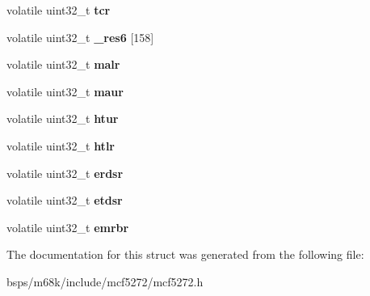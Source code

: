 \begin{DoxyCompactItemize}
\mbox{\label{structenet__regs__t_ad500d2fb5cc2c951c987d8d2b84334c3}} 
volatile uint32\+\_\+t {\bfseries tcr}
\item 
\mbox{\label{structenet__regs__t_a6ca7952eb64146f7015ad9e3bef0a038}} 
volatile uint32\+\_\+t {\bfseries \+\_\+res6} \mbox{[}158\mbox{]}
\item 
\mbox{\label{structenet__regs__t_aa9d3849bd62e420956f5fb5ec650e377}} 
volatile uint32\+\_\+t {\bfseries malr}
\item 
\mbox{\label{structenet__regs__t_a289d43007238bbc47a5179d5b0d11570}} 
volatile uint32\+\_\+t {\bfseries maur}
\item 
\mbox{\label{structenet__regs__t_afa4af73d0d5f907da00906e9e0e3ebcf}} 
volatile uint32\+\_\+t {\bfseries htur}
\item 
\mbox{\label{structenet__regs__t_a25bf1aad6c37badac739b68b90688288}} 
volatile uint32\+\_\+t {\bfseries htlr}
\item 
\mbox{\label{structenet__regs__t_a785d8d24ffe23b5fd78d3dcad721c80f}} 
volatile uint32\+\_\+t {\bfseries erdsr}
\item 
\mbox{\label{structenet__regs__t_a5e6726afb1f1b2e03917e4e87e424d63}} 
volatile uint32\+\_\+t {\bfseries etdsr}
\item 
\mbox{\label{structenet__regs__t_abccc86821243eeb3e880a352846e7df1}} 
volatile uint32\+\_\+t {\bfseries emrbr}
\end{DoxyCompactItemize}


The documentation for this struct was generated from the following file\+:\begin{DoxyCompactItemize}
\item 
bsps/m68k/include/mcf5272/mcf5272.\+h\end{DoxyCompactItemize}
